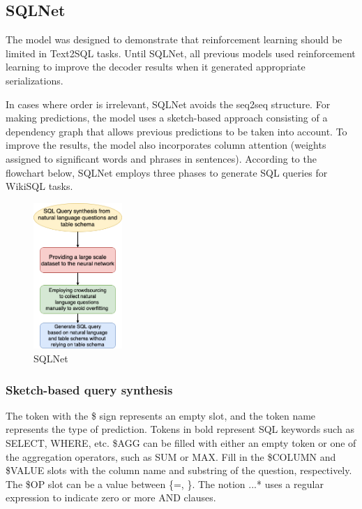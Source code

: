 \subsection*{SQLNet}

The model was designed to demonstrate that reinforcement learning should be limited in Text2SQL tasks.
Until SQLNet\cite{xu_sqlnet_2017}, all previous models used reinforcement learning to improve the decoder results when it generated appropriate serializations.


In cases where order is irrelevant, SQLNet avoids the seq2seq structure.
For making predictions, the model uses a sketch-based approach consisting of a dependency graph that allows previous predictions to be taken into account.
To improve the results, the model also incorporates column attention (weights assigned to significant words and phrases in sentences). According to the flowchart below, SQLNet employs three phases to generate SQL queries for WikiSQL tasks.

\begin{figure}[htb]
    \centering
    \includegraphics[width=0.3\textwidth]{pics/sqlnet/sqlnet.png}
    \caption{SQLNet}
    \label{fig:sqlnet}
\end{figure}

\subsubsection*{Sketch-based query synthesis}

The token with the \$ sign represents an empty slot, and the token name represents the type of prediction. Tokens in bold represent SQL keywords such as SELECT, WHERE, etc.
\$AGG can be filled with either an empty token or one of the aggregation operators, such as SUM or MAX. Fill in the \$COLUMN and \$VALUE slots with the column name and substring of the question, respectively. The \$OP slot can be a value between \{=, \}. The notion \(...\)* uses a regular expression to indicate zero or more AND clauses.


